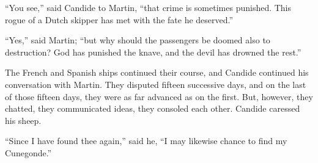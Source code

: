 ``You see,'' said Candide to Martin, ``that crime is sometimes punished. This rogue of a Dutch skipper has met with the fate he deserved.''

``Yes,'' said Martin; ``but why should the passengers be doomed also to destruction? God has punished the knave, and the devil has drowned the rest.''

The French and Spanish ships continued their course, and Candide continued his conversation with Martin. They disputed fifteen successive days, and on the last of those fifteen days, they were as far advanced as on the first. But, however, they chatted, they communicated ideas, they consoled each other. Candide caressed his sheep.

``Since I have found thee again,'' said he, ``I may likewise chance to find my Cunegonde.''

